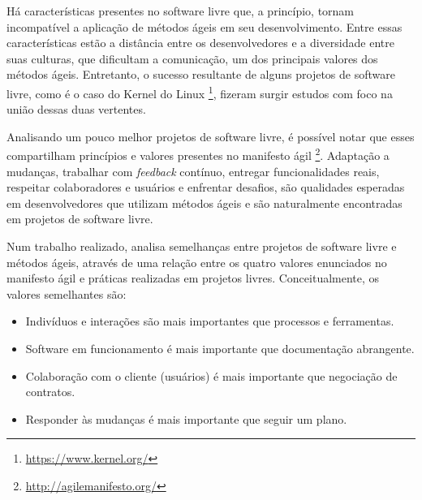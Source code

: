 Há características presentes no software livre que, a princípio, tornam incompatível a aplicação de métodos ágeis em seu desenvolvimento. Entre essas características estão a distância entre os desenvolvedores e a diversidade entre suas culturas, que dificultam a comunicação, um dos principais valores dos métodos ágeis. Entretanto, o sucesso resultante de alguns projetos de software livre, como é o caso do Kernel do Linux \footnote{\url{https://www.kernel.org/}}, fizeram surgir estudos com foco na união dessas duas vertentes.

Analisando um pouco melhor projetos de software livre, é possível notar que esses compartilham princípios e valores presentes no manifesto ágil \footnote{\url{http://agilemanifesto.org/}}. Adaptação a mudanças, trabalhar com \textit{feedback} contínuo, entregar funcionalidades reais, respeitar colaboradores e usuários e enfrentar desafios, são qualidades esperadas em desenvolvedores que utilizam métodos ágeis e são naturalmente encontradas em projetos de software livre.

Num trabalho realizado,  analisa semelhanças entre projetos de software livre e métodos ágeis, através de uma relação entre os quatro valores enunciados no manifesto ágil e práticas realizadas em projetos livres. 
%
%
Conceitualmente, os valores semelhantes são:

\begin{itemize}

\item {Indivíduos e interações são mais importantes que processos e ferramentas.}

\item {Software em funcionamento é mais importante que documentação abrangente.}

\item {Colaboração com o cliente (usuários) é mais importante que negociação de contratos.}

\item {Responder às mudanças é mais importante que seguir um plano.}

\end{itemize}

